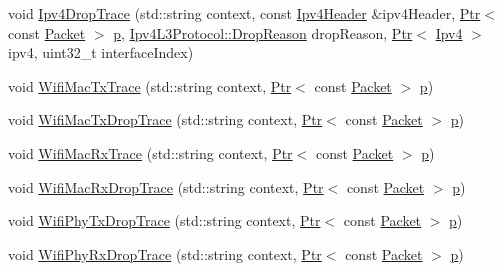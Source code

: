 \begin{DoxyCompactItemize}
\item 
void \hyperlink{classns3_1_1AnimationInterface_a3942d87e39b866782a27ecbd3df53027}{Ipv4\+Drop\+Trace} (std\+::string context, const \hyperlink{classns3_1_1Ipv4Header}{Ipv4\+Header} \&ipv4\+Header, \hyperlink{classns3_1_1Ptr}{Ptr}$<$ const \hyperlink{classns3_1_1Packet}{Packet} $>$ \hyperlink{lte__link__budget__x2__handover__measures_8m_ac9de518908a968428863f829398a4e62}{p}, \hyperlink{classns3_1_1Ipv4L3Protocol_a05e7403d60c79529257c4cffdd994da1}{Ipv4\+L3\+Protocol\+::\+Drop\+Reason} drop\+Reason, \hyperlink{classns3_1_1Ptr}{Ptr}$<$ \hyperlink{classns3_1_1Ipv4}{Ipv4} $>$ ipv4, uint32\+\_\+t interface\+Index)
\item 
void \hyperlink{classns3_1_1AnimationInterface_aa89ac73654e71439723b97fd2abd7165}{Wifi\+Mac\+Tx\+Trace} (std\+::string context, \hyperlink{classns3_1_1Ptr}{Ptr}$<$ const \hyperlink{classns3_1_1Packet}{Packet} $>$ \hyperlink{lte__link__budget__x2__handover__measures_8m_ac9de518908a968428863f829398a4e62}{p})
\item 
void \hyperlink{classns3_1_1AnimationInterface_a7d0270326bf5c725d2e4b704ce6753fa}{Wifi\+Mac\+Tx\+Drop\+Trace} (std\+::string context, \hyperlink{classns3_1_1Ptr}{Ptr}$<$ const \hyperlink{classns3_1_1Packet}{Packet} $>$ \hyperlink{lte__link__budget__x2__handover__measures_8m_ac9de518908a968428863f829398a4e62}{p})
\item 
void \hyperlink{classns3_1_1AnimationInterface_af0f567a79961b657036e8064d01da44a}{Wifi\+Mac\+Rx\+Trace} (std\+::string context, \hyperlink{classns3_1_1Ptr}{Ptr}$<$ const \hyperlink{classns3_1_1Packet}{Packet} $>$ \hyperlink{lte__link__budget__x2__handover__measures_8m_ac9de518908a968428863f829398a4e62}{p})
\item 
void \hyperlink{classns3_1_1AnimationInterface_a2b6a14ca45b40c59a1db04a71d67f913}{Wifi\+Mac\+Rx\+Drop\+Trace} (std\+::string context, \hyperlink{classns3_1_1Ptr}{Ptr}$<$ const \hyperlink{classns3_1_1Packet}{Packet} $>$ \hyperlink{lte__link__budget__x2__handover__measures_8m_ac9de518908a968428863f829398a4e62}{p})
\item 
void \hyperlink{classns3_1_1AnimationInterface_add1a11f8ca980b4f4b9026b819603c45}{Wifi\+Phy\+Tx\+Drop\+Trace} (std\+::string context, \hyperlink{classns3_1_1Ptr}{Ptr}$<$ const \hyperlink{classns3_1_1Packet}{Packet} $>$ \hyperlink{lte__link__budget__x2__handover__measures_8m_ac9de518908a968428863f829398a4e62}{p})
\item 
void \hyperlink{classns3_1_1AnimationInterface_a7ce67008823d58bb1c3c710769c27ac6}{Wifi\+Phy\+Rx\+Drop\+Trace} (std\+::string context, \hyperlink{classns3_1_1Ptr}{Ptr}$<$ const \hyperlink{classns3_1_1Packet}{Packet} $>$ \hyperlink{lte__link__budget__x2__handover__measures_8m_ac9de518908a968428863f829398a4e62}{p})

\end{DoxyCompactItemize}
